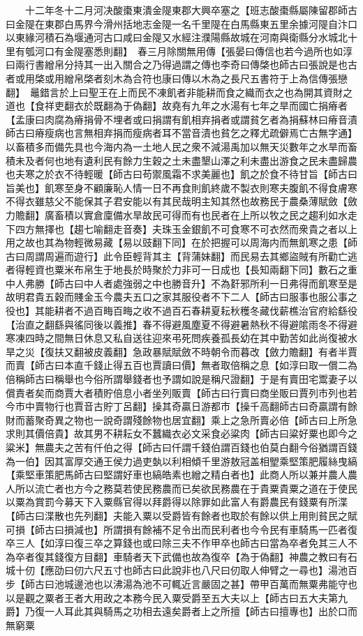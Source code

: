 　　十二年冬十二月河决酸棗東潰金隄東郡大興卒塞之【班志酸棗縣屬陳留郡師古曰金隄在東郡白馬界今滑州括地志金隄一名千里隄在白馬縣東五里余據河隄自汴口以東緣河積石為堰通河古口咸曰金隄又水經注濮陽縣故城在河南與衛縣分水城北十里有瓠河口有金隄塞悉則翻】　春三月除關無用傳【張晏曰傳信也若今過所也如淳曰兩行書繒帛分持其一出入關合之乃得過謂之傳也李奇曰傳棨也師古曰張說是也古者或用棨或用繒帛棨者刻木為合符也康曰傳以木為之長尺五書符于上為信傳張戀翻】　鼂錯言於上曰聖王在上而民不凍飢者非能耕而食之織而衣之也為開其資財之道也【食祥吏翻衣於既翻為于偽翻】故堯有九年之水湯有七年之旱而國亡捐瘠者【孟康曰肉腐為瘠捐骨不埋者或曰捐謂有飢相弃捐者或謂貧乞者為捐蘇林曰瘠音漬師古曰瘠瘦病也言無相弃捐而瘦病者耳不當音漬也貧乞之釋尤疏僻焉亡古無字通】以畜積多而備先具也今海内為一土地人民之衆不減湯禹加以無天災數年之水旱而畜積未及者何也地有遺利民有餘力生穀之土未盡墾山澤之利未盡出游食之民未盡歸農也夫寒之於衣不待輕暖【師古曰苟禦風霜不求美麗也】飢之於食不待甘旨【師古曰旨美也】飢寒至身不顧廉恥人情一日不再食則飢終歲不製衣則寒夫腹飢不得食膚寒不得衣雖慈父不能保其子君安能以有其民哉明主知其然也故務民于農桑薄賦斂【斂力贍翻】廣畜積以實倉廩備水旱故民可得而有也民者在上所以牧之民之趨利如水走下四方無擇也【趨七喻翻走音奏】夫珠玉金銀飢不可食寒不可衣然而衆貴之者以上用之故也其為物輕微易藏【易以豉翻下同】在於把握可以周海内而無飢寒之患【師古曰周謂周遍而遊行】此令臣輕背其主【背蒲妹翻】而民易去其鄉盜賊有所勸亡逃者得輕資也粟米布帛生于地長於時聚於力非可一日成也【長知兩翻下同】數石之重中人弗勝【師古曰中人者處強弱之中也勝音升】不為姧邪所利一日弗得而飢寒至是故明君貴五穀而賤金玉今農夫五口之家其服役者不下二人【師古曰服事也服公事之役也】其能耕者不過百畮百畮之收不過百石春耕夏耘秋穫冬藏伐薪樵治官府給繇役【治直之翻繇與徭同後以義推】春不得避風塵夏不得避暑熱秋不得避隂雨冬不得避寒凍四時之間無日休息又私自送往迎來弔死問疾養孤長幼在其中勤苦如此尚復被水旱之災【復扶又翻被皮義翻】急政暴賦賦斂不時朝令而暮改【斂力贍翻】有者半賈而賣【師古曰本直千錢止得五百也賈讀曰價】無者取倍稱之息【如淳曰取一償二為倍稱師古曰稱舉也今俗所謂舉錢者也予謂如說是稱尺證翻】于是有賣田宅鬻妻子以償責者矣而商賈大者積貯倍息小者坐列販賣【師古曰行賣曰商坐販曰賈列市列也若今市中賣物行也賈音古貯丁呂翻】操其奇贏日游都市【操千高翻師古曰奇贏謂有餘財而蓄聚奇異之物也一說奇謂殘餘物也居宜翻】乘上之急所賣必倍【師古曰上所急求則其價倍貴】故其男不耕耘女不蠶織衣必文采食必粱肉【師古曰粱好粟也即今之粱米】無農夫之苦有仟伯之得【師古曰仟謂千錢伯謂百錢也伯莫白翻今俗猶謂百錢為一伯】因其富厚交通王侯力過吏埶以利相傾千里游敖冠盖相朢乘堅策肥履絲曳縞【乘堅車策肥馬師古曰堅謂好車也縞皓素也繒之精白者也】此商人所以兼并農人農人所以流亡者也方今之務莫若使民務農而已矣欲民務農在于貴粟貴粟之道在于使民以粟為賞罰今募天下入粟縣官得以拜爵得以除罪如此富人有爵農民有錢粟有所渫【師古曰渫散也先列翻】夫能入粟以受爵皆有餘者也取於有餘以供上用則貧民之賦可損【師古曰損減也】所謂損有餘補不足令出而民利者也今令民有車騎馬一匹者復卒三人【如淳曰復三卒之算錢也或曰除三夫不作甲卒也師古曰當為卒者免其三人不為卒者復其錢復方目翻】車騎者天下武備也故為復卒【為于偽翻】神農之教曰有石城十仞【應劭曰仞六尺五寸也師古曰此說非也八尺曰仞取人伸臂之一尋也】湯池百步【師古曰池城邊池也以沸湯為池不可輒近言嚴固之甚】帶甲百萬而無粟弗能守也以是觀之粟者王者大用政之本務今民入粟受爵至五大夫以上【師古曰五大夫第九爵】乃復一人耳此其與騎馬之功相去遠矣爵者上之所擅【師古曰擅專也】出於口而無窮粟
